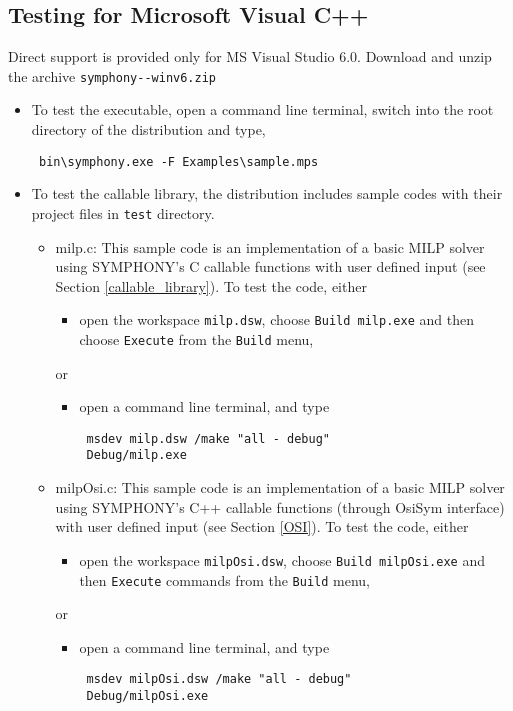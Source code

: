 \subsection{Testing for Microsoft Visual C++}
Direct support is provided only for MS Visual Studio 6.0. 
Download and unzip the archive \texttt{symphony-\VER-winv6.zip} 
\begin{itemize}
\item To test the executable, open a command line terminal,  
switch into the root directory of the distribution and type, 
{\color{Brown}
\begin{verbatim}
 bin\symphony.exe -F Examples\sample.mps
 \end{verbatim}
}
\item To test the callable library, the distribution includes sample codes with
their project files in \texttt{test} directory. 
\begin{itemize}
\item milp.c: This sample code is an implementation of a basic MILP solver 
using SYMPHONY's C callable functions with user defined input 
(see Section \ref{callable_library}). 
To test the code, either 

\begin{itemize}
\item open the workspace \texttt{milp.dsw}, choose \texttt{Build milp.exe}
and then choose \texttt{Execute} from the \texttt{Build} menu, 
\end{itemize}
or
\begin{itemize}
\item open a command line terminal, and type 
{\color{Brown}
\begin{verbatim}
 msdev milp.dsw /make "all - debug"
 Debug/milp.exe
 \end{verbatim}
}
\end{itemize}
\item  milpOsi.c: This sample code is an implementation of a basic MILP 
solver using SYMPHONY's C++ callable functions (through OsiSym interface)
with user defined input (see Section \ref{OSI}). To test the code, either 
\begin{itemize}
\item open the workspace \texttt{milpOsi.dsw}, 
choose \texttt{Build milpOsi.exe} and then 
\texttt{Execute} commands from the \texttt{Build} menu, 
\end{itemize}
or
\begin{itemize}
\item open a command line terminal, and type 
{\color{Brown}
\begin{verbatim}
 msdev milpOsi.dsw /make "all - debug"
 Debug/milpOsi.exe
 \end{verbatim}
}
\end{itemize}
\end{itemize}
\end{itemize}
